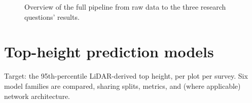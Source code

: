 %
%
\begin{figure}[!htbp]
\centering
{}
\caption{Overview of the full pipeline from raw data to the three research questions' results.}
\label{fig:pipeline-overview}
\end{figure}

\section{Top-height prediction models}
\label{sec:rq1}

Target: the 95th-percentile LiDAR-derived top height, per plot per survey. Six model families are
compared, sharing splits, metrics, and (where applicable) network architecture.

